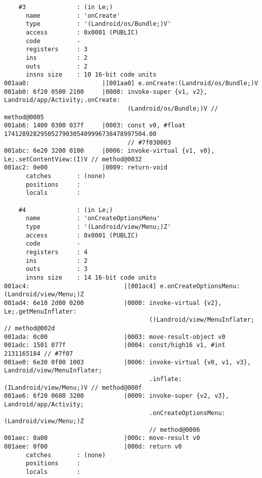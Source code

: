 \begin{lstlisting}
    #3              : (in Le;)
      name          : 'onCreate'
      type          : '(Landroid/os/Bundle;)V'
      access        : 0x0001 (PUBLIC)
      code          -
      registers     : 3
      ins           : 2
      outs          : 2
      insns size    : 10 16-bit code units
001aa0:                    |[001aa0] e.onCreate:(Landroid/os/Bundle;)V
001ab0: 6f20 0500 2100     |0000: invoke-super {v1, v2}, Landroid/app/Activity;.onCreate:
                                  (Landroid/os/Bundle;)V // method@0005
001ab6: 1400 0300 037f     |0003: const v0, #float 174128928295052790305409996738478997504.00
                                  // #7f030003
001abc: 6e20 3200 0100     |0006: invoke-virtual {v1, v0}, Le;.setContentView:(I)V // method@0032
001ac2: 0e00               |0009: return-void
      catches       : (none)
      positions     :
      locals        :

    #4              : (in Le;)
      name          : 'onCreateOptionsMenu'
      type          : '(Landroid/view/Menu;)Z'
      access        : 0x0001 (PUBLIC)
      code          -
      registers     : 4
      ins           : 2
      outs          : 3
      insns size    : 14 16-bit code units
001ac4:                          |[001ac4] e.onCreateOptionsMenu:(Landroid/view/Menu;)Z
001ad4: 6e10 2d00 0200           |0000: invoke-virtual {v2}, Le;.getMenuInflater:
                                        ()Landroid/view/MenuInflater; // method@002d
001ada: 0c00                     |0003: move-result-object v0
001adc: 1501 077f                |0004: const/high16 v1, #int 2131165184 // #7f07
001ae0: 6e30 0f00 1003           |0006: invoke-virtual {v0, v1, v3}, Landroid/view/MenuInflater;
                                        .inflate:(ILandroid/view/Menu;)V // method@000f
001ae6: 6f20 0600 3200           |0009: invoke-super {v2, v3}, Landroid/app/Activity;
                                        .onCreateOptionsMenu:(Landroid/view/Menu;)Z
                                        // method@0006
001aec: 0a00                     |000c: move-result v0
001aee: 0f00                     |000d: return v0
      catches       : (none)
      positions     :
      locals        :


\end{lstlisting}
